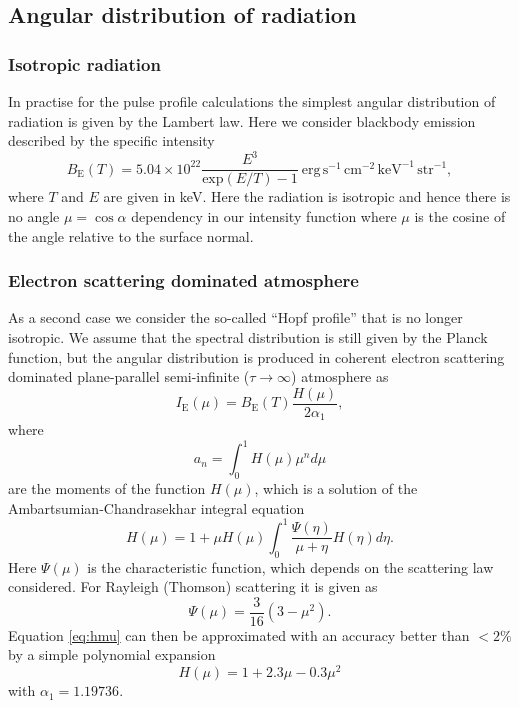 \documentclass[iop, usenatbib]{emulateapj}
\begin{document}
\subsection{Angular distribution of radiation}
\subsubsection{Isotropic radiation}

In practise for the pulse profile calculations the simplest angular distribution of radiation is given by the Lambert law.
Here we consider blackbody emission described by the specific intensity
\begin{equation}
  B_{\mathrm{E}}(T) = 5.04 \times 10^{22} \frac{E^3}{\mathrm{exp}(E/T) -1}~\mathrm{erg}\,\mathrm{s}^{-1}\,\mathrm{cm}^{-2}\,\mathrm{keV}^{-1}\,\mathrm{str}^{-1},
\end{equation}
where $T$ and $E$ are given in keV.
Here the radiation is isotropic and hence there is no angle $\mu = \cos\alpha$ dependency in our intensity function where $\mu$ is the cosine of the angle relative to the surface normal.

\subsubsection{Electron scattering dominated atmosphere}

As a second case we consider the so-called ``Hopf profile'' that is no longer isotropic.
We assume that the spectral distribution is still given by the Planck function, but the angular distribution is produced in coherent electron scattering dominated plane-parallel semi-infinite ($\tau \rightarrow \infty$) atmosphere as
\begin{equation}
  I_{\mathrm{E}}(\mu) = B_{\mathrm{E}}(T) \frac{H(\mu)}{2\alpha_1},
\end{equation}
where
\begin{equation}
  a_n = \int_0^1 H(\mu) \mu^n d\mu
\end{equation}
are the moments of the function $H(\mu)$, which is a solution of the Ambartsumian-Chandrasekhar integral equation \citep[see e.g.][]{Cha60,Sob63}
\begin{equation}\label{eq:hmu}
  H(\mu) = 1 + \mu H(\mu) \int_0^1 \frac{\Psi(\eta)}{\mu + \eta} H(\eta) d\eta.
\end{equation}
Here $\Psi(\mu)$ is the characteristic function, which depends on the scattering law considered.
For Rayleigh (Thomson) scattering it is given as
\begin{equation}
  \Psi(\mu) = \frac{3}{16}(3-\mu^2).
\end{equation}
Equation \eqref{eq:hmu} can then be approximated with an accuracy better than $<2\%$ by a simple polynomial expansion
\begin{equation}
  H(\mu) = 1 + 2.3\mu - 0.3\mu^2
\end{equation}
with $\alpha_1 = 1.19736$.
\end{document}
